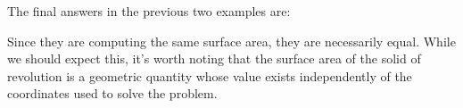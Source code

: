 \documentclass{ximera}
\begin{document}
  \begin{question}
  The final answers in the previous two examples are:
  \begin{multipleChoice}
  \end{multipleChoice}
  \begin{feedback}
    Since they are computing the same surface area, they are necessarily equal. While we should expect this, it's worth noting that the surface area of the solid of revolution is a geometric quantity whose value exists independently of the coordinates used to solve the problem.  

  \end{feedback}
\end{question}
\end{document}
